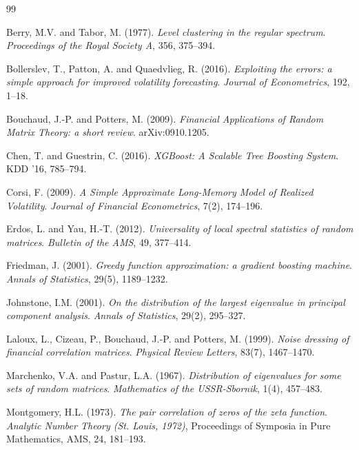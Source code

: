\documentclass[11pt,a4paper]{article}
\begin{document}
\begin{thebibliography}{99}

Berry, M.V. and Tabor, M. (1977). \emph{Level clustering in the regular spectrum}. \emph{Proceedings of the Royal Society A}, 356, 375--394.

Bollerslev, T., Patton, A. and Quaedvlieg, R. (2016). \emph{Exploiting the errors: a simple approach for improved volatility forecasting}. \emph{Journal of Econometrics}, 192, 1--18.

Bouchaud, J.-P. and Potters, M. (2009). \emph{Financial Applications of Random Matrix Theory: a short review}. arXiv:0910.1205.

Chen, T. and Guestrin, C. (2016). \emph{XGBoost: A Scalable Tree Boosting System}. KDD '16, 785--794.

Corsi, F. (2009). \emph{A Simple Approximate Long-Memory Model of Realized Volatility}. \emph{Journal of Financial Econometrics}, 7(2), 174--196.

Erdos, L. and Yau, H.-T. (2012). \emph{Universality of local spectral statistics of random matrices}. \emph{Bulletin of the AMS}, 49, 377--414.

Friedman, J. (2001). \emph{Greedy function approximation: a gradient boosting machine}. \emph{Annals of Statistics}, 29(5), 1189--1232.

Johnstone, I.M. (2001). \emph{On the distribution of the largest eigenvalue in principal component analysis}. \emph{Annals of Statistics}, 29(2), 295--327.

Laloux, L., Cizeau, P., Bouchaud, J.-P. and Potters, M. (1999). \emph{Noise dressing of financial correlation matrices}. \emph{Physical Review Letters}, 83(7), 1467--1470.

Marchenko, V.A. and Pastur, L.A. (1967). \emph{Distribution of eigenvalues for some sets of random matrices}. \emph{Mathematics of the USSR-Sbornik}, 1(4), 457--483.

Montgomery, H.L. (1973). \emph{The pair correlation of zeros of the zeta function}. \emph{Analytic Number Theory (St. Louis, 1972)}, Proceedings of Symposia in Pure Mathematics, AMS, 24, 181--193.


\end{thebibliography}
\end{document}
